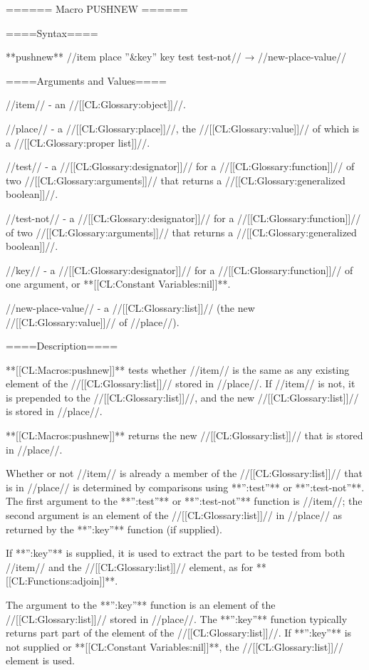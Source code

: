 ====== Macro PUSHNEW ======

====Syntax====

**pushnew** //item place ''&key'' key test test-not// → //new-place-value//

====Arguments and Values====

//item// - an //[[CL:Glossary:object]]//.

//place// - a //[[CL:Glossary:place]]//, the //[[CL:Glossary:value]]// of which is a //[[CL:Glossary:proper list]]//.

//test// - a //[[CL:Glossary:designator]]// for a //[[CL:Glossary:function]]// of two //[[CL:Glossary:arguments]]// that returns a //[[CL:Glossary:generalized boolean]]//.

//test-not// - a //[[CL:Glossary:designator]]// for a //[[CL:Glossary:function]]// of two //[[CL:Glossary:arguments]]// that returns a //[[CL:Glossary:generalized boolean]]//.

//key// - a //[[CL:Glossary:designator]]// for a //[[CL:Glossary:function]]// of one argument, or **[[CL:Constant Variables:nil]]**.

//new-place-value// - a //[[CL:Glossary:list]]// (the new //[[CL:Glossary:value]]// of //place//).

====Description====

**[[CL:Macros:pushnew]]** tests whether //item// is the same as any existing element of the //[[CL:Glossary:list]]// stored in //place//. If //item// is not, it is prepended to the //[[CL:Glossary:list]]//, and the new //[[CL:Glossary:list]]// is stored in //place//.

**[[CL:Macros:pushnew]]** returns the new //[[CL:Glossary:list]]// that is stored in //place//.

Whether or not //item// is already a member of the //[[CL:Glossary:list]]// that is in //place// is determined by comparisons using **'':test''** or **'':test-not''**. The first argument to the **'':test''** or **'':test-not''** function is //item//; the second argument is an element of the //[[CL:Glossary:list]]// in //place// as returned by the **'':key''** function (if supplied).

If **'':key''** is supplied, it is used to extract the part to be tested from both //item// and the //[[CL:Glossary:list]]// element, as for **[[CL:Functions:adjoin]]**.

The argument to the **'':key''** function is an element of the //[[CL:Glossary:list]]// stored in //place//. The **'':key''** function typically returns part part of the element of the //[[CL:Glossary:list]]//. If **'':key''** is not supplied or **[[CL:Constant Variables:nil]]**, the //[[CL:Glossary:list]]// element is used.

